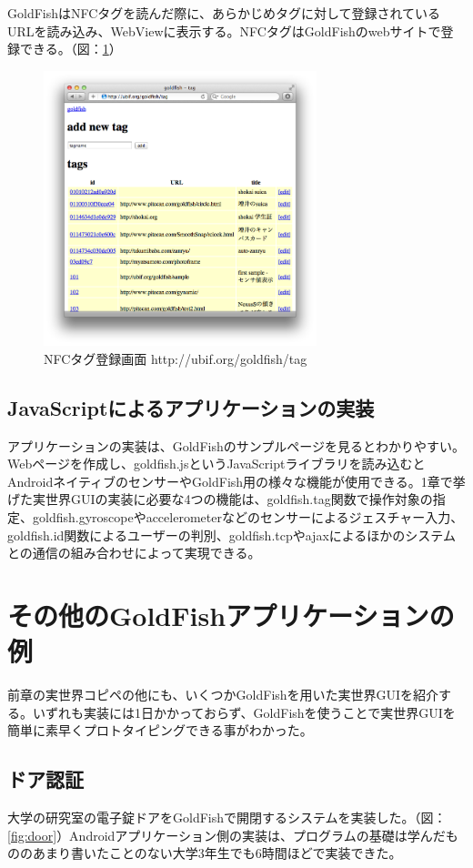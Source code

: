 GoldFishはNFCタグを読んだ際に、あらかじめタグに対して登録されているURLを読み込み、WebViewに表示する。NFCタグはGoldFishのwebサイトで登録できる。（図：\ref{fig:tags}）
\begin{figure}
  \begin{center}
    \includegraphics[height=80mm]{img/tags.png}
  \end{center}
  \caption{NFCタグ登録画面 http://ubif.org/goldfish/tag}
  \label{fig:tags}
\end{figure}

\subsection{JavaScriptによるアプリケーションの実装}
アプリケーションの実装は、GoldFishのサンプルページ\cite{sample}を見るとわかりやすい。Webページを作成し、goldfish.jsというJavaScriptライブラリを読み込むとAndroidネイティブのセンサーやGoldFish用の様々な機能が使用できる。1章で挙げた実世界GUIの実装に必要な4つの機能は、goldfish.tag関数で操作対象の指定、goldfish.gyroscopeやaccelerometerなどのセンサーによるジェスチャー入力、goldfish.id関数によるユーザーの判別、goldfish.tcpやajaxによるほかのシステムとの通信の組み合わせによって実現できる。


\section{その他のGoldFishアプリケーションの例}
前章の実世界コピペの他にも、いくつかGoldFishを用いた実世界GUIを紹介する。いずれも実装には1日かかっておらず、GoldFishを使うことで実世界GUIを簡単に素早くプロトタイピングできる事がわかった。

\subsection{ドア認証}
大学の研究室の電子錠ドアをGoldFishで開閉するシステムを実装した。（図：\ref{fig:door}）Androidアプリケーション側の実装は、プログラムの基礎は学んだもののあまり書いたことのない大学3年生でも6時間ほどで実装できた。

